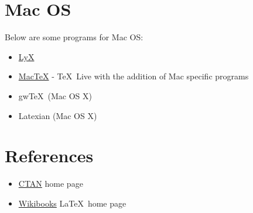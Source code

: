 \documentclass[12pt]{report}
\begin{document}
\section{Mac OS}
Below are some programs for Mac OS:\@
\begin{itemize}
\item \href{http://www.lyx.org/}{LyX}
\item\href{http://www.tug.org/mactex/}{Mac\TeX}
\subitem- \TeX\ Live with the addition of Mac specific programs
\item gw\TeX\   (Mac OS X)
\item Latexian (Mac OS X)
\end{itemize}

\section{References}
\label{sec:refs}
\begin{itemize}
\item \href{http://www.ctan.org}{CTAN} home page
\item \href{http://en.wikibooks.org/wiki/LaTeX/}{Wikibooks} \LaTeX\ home page
\end{itemize}


%
%
\clearpage {}\ %
\renewcommand\baselinestretch{1.5}


%
\begin{appendices}
\ %

\

\end{appendices}
%
%
%
\end{document}
